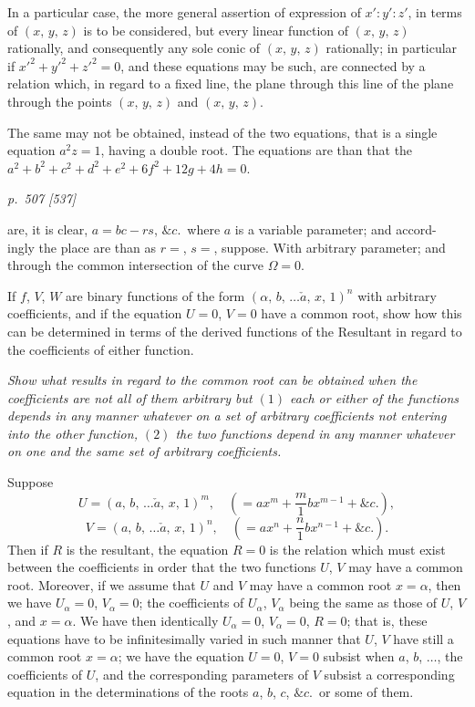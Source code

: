 \documentclass[11pt,a4paper]{book}
\begin{document}
In a particular case, the more general assertion of expression of $x' : y' : z'$, in terms
of $(x,\, y,\, z)$ is to be considered, but every linear function of $(x,\, y,\, z)$ rationally, and consequently any
sole conic of $(x,\, y,\, z)$ rationally; in particular if $x'^2 + y'^2 + z'^2 = 0$, and these
equations may be such, are connected by a relation which, in regard to a fixed line, the
plane through this line of the plane through the points $(x,\, y,\, z)$ and $(x,\, y,\, z)$.

The same may not be obtained, instead of the two equations, that is a single
equation $a^2 z = 1$, having a double root. The equations are than that the
$a^2 + b^2 + c^2 + d^2 + e^2 + 6f^2 + 12g + 4h = 0$.

\clearpage

\bigskip
\textit{p.~507 [537]}
\smallskip

\noindent
are, it is clear, $a = bc - rs$, $\&c.$\, where $a$ is a variable parameter; and accord-
ingly the place are than as $r = $, $s = $, suppose. With arbitrary parameter; and
through the common intersection of the curve $\Omega = 0$.

If $f$, $V$, $W$ are binary functions of the form $(\alpha,\, b,\, \ldots\check{a},\, x,\, 1)^n$ with arbitrary
coefficients, and if the equation $U = 0$, $V = 0$ have a common root, show how this can
be determined in terms of the derived functions of the Resultant in regard to the
coefficients of either function.

\textit{Show what results in regard to the common root can be obtained when the coefficients
are not all of them arbitrary but $(1)$ each or either of the functions depends in any
manner whatever on a set of arbitrary coefficients not entering into the other function,
$(2)$ the two functions depend in any manner whatever on one and the same set of
arbitrary coefficients.}

Suppose
\[
U = (a,\, b,\, \ldots\check{a},\, x,\, 1)^m, \quad \left(= ax^m + \frac{m}{1}b x^{m-1} + \&c.\right),
\]
\[
V = (a,\, b,\, \ldots\check{a},\, x,\, 1)^n, \quad \left(= ax^n + \frac{n}{1}b x^{n-1} + \&c.\right).
\]
Then if $R$ is the resultant, the equation $R = 0$ is the relation which must exist
between the coefficients in order that the two functions $U$, $V$ may have a common root.
Moreover, if we assume that $U$ and $V$ may have a common root $x = \alpha$, then we have
$U_\alpha = 0$, $V_\alpha = 0$; the coefficients of $U_\alpha$, $V_\alpha$ being the same as those of $U$, $V$, and $x = \alpha$.
We have then identically $U_\alpha = 0$, $V_\alpha = 0$, $R = 0$; that is, these equations have to
be infinitesimally varied in such manner that $U$, $V$ have still a common root
$x = \alpha$; we have the equation $U = 0$, $V = 0$ subsist when $a$, $b$, $\ldots$, the coefficients of $U$,
and the corresponding parameters of $V$ subsist a corresponding equation in the
determinations of the roots $a$, $b$, $c$, $\&c.$\, or some of them.
\end{document}
